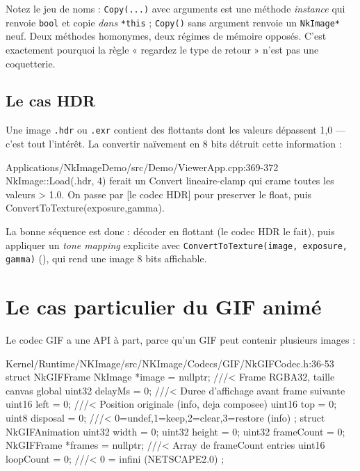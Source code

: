 Notez le jeu de noms : \texttt{Copy(...)} avec arguments est une méthode
\emph{instance} qui renvoie \texttt{bool} et copie \emph{dans} \texttt{*this} ;
\texttt{Copy()} sans argument renvoie un \texttt{NkImage*} neuf. Deux méthodes
homonymes, deux régimes de mémoire opposés. C'est exactement pourquoi la règle
« regardez le type de retour » n'est pas une coquetterie.

\subsection{Le cas HDR}

Une image \texttt{.hdr} ou \texttt{.exr} contient des flottants dont les valeurs
dépassent 1,0 — c'est tout l'intérêt. La convertir naïvement en 8 bits détruit
cette information :

\begin{nkcode}{Applications/NkImageDemo/src/Demo/ViewerApp.cpp:369-372}
 NkImage::Load(.hdr, 4) ferait un Convert lineaire-clamp qui
 crame toutes les valeurs > 1.0. On passe par [le codec HDR]
 pour preserver le float, puis ConvertToTexture(exposure,gamma).
\end{nkcode}

La bonne séquence est donc : décoder en flottant (le codec HDR le fait), puis
appliquer un \emph{tone mapping} explicite avec
\texttt{ConvertToTexture(image, exposure, gamma)}
(), qui rend une image 8 bits affichable.

\section{Le cas particulier du GIF animé}

Le codec GIF a une API à part, parce qu'un GIF peut contenir plusieurs images :

\begin{nkcode}{Kernel/Runtime/NKImage/src/NKImage/Codecs/GIF/NkGIFCodec.h:36-53}
struct NkGIFFrame {
        NkImage *image = nullptr; ///< Frame RGBA32, taille canvas global
        uint32 delayMs = 0;       ///< Duree d'affichage avant frame suivante
        uint16 left = 0;          ///< Position originale (info, deja composee)
        uint16 top = 0;
        uint8 disposal = 0;       ///< 0=undef,1=keep,2=clear,3=restore (info)
};
struct NkGIFAnimation {
        uint32 width = 0; uint32 height = 0; uint32 frameCount = 0;
        NkGIFFrame *frames = nullptr;  ///< Array de frameCount entries
        uint16 loopCount = 0;          ///< 0 = infini (NETSCAPE2.0)
};
\end{nkcode}

